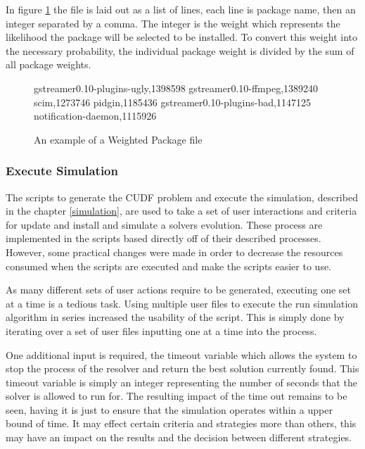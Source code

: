 In figure \ref{packageprob} the file is laid out as a list of lines, each line is package name, then an integer separated by a comma.
The integer is the weight which represents the likelihood the package will be selected to be installed.
To convert this weight into the necessary probability, the individual package weight is divided by the sum of all package weights. 

\begin{figure}[htp]
\begin{center}
gstreamer0.10-plugins-ugly,1398598
gstreamer0.10-ffmpeg,1389240
scim,1273746
pidgin,1185436
gstreamer0.10-plugins-bad,1147125
notification-daemon,1115926
\caption[Weighted Package File Example]{An example of a Weighted Package file }
\label{packageprob}
\end{center}
\end{figure}

\subsubsection{Execute Simulation}
The scripts to generate the CUDF problem and execute the simulation, described in the chapter \ref{simulation}, 
are used to take a set of user interactions and criteria for update and install and simulate a solvers evolution.
These process are implemented in the scripts based directly off of their described processes. 
However, some practical changes were made in order to decrease the resources consumed when the scripts are executed and make the scripts easier to use.

As many different sets of user actions require to be generated, executing one set at a time is a tedious task.
Using multiple user files to execute the run simulation algorithm in series increased the usability of the script.
This is simply done by iterating over a set of user files inputting one at a time into the process. 

One additional input is required, the timeout variable which allows the system to stop the process of the resolver and return the best solution currently found.
This timeout variable is simply an integer representing the number of seconds that the solver is allowed to run for.
The resulting impact of the time out remains to be seen, having it is just to ensure that the simulation operates within a upper bound of time.
It may effect certain criteria and strategies more than others, this may have an impact on the results and the decision between different strategies.

